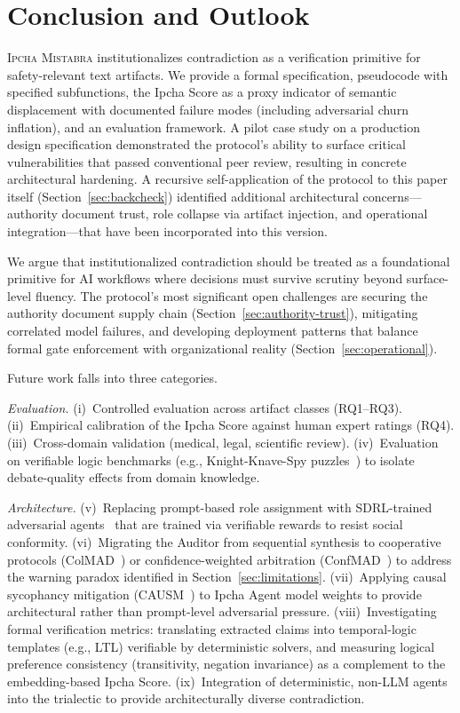 \documentclass[11pt,a4paper]{article}
\newcommand{\methodname}{\textsc{Ipcha Mistabra}}
\begin{document}
\section{Conclusion and Outlook}
\label{sec:outlook}
\methodname{} institutionalizes contradiction as a verification primitive for safety-relevant text artifacts.
We provide a formal specification, pseudocode with specified subfunctions, the Ipcha Score as a proxy indicator of semantic displacement with documented failure modes (including adversarial churn inflation), and an evaluation framework.
A pilot case study on a production design specification demonstrated the protocol's ability to surface critical vulnerabilities that passed conventional peer review, resulting in concrete architectural hardening.
A recursive self-application of the protocol to this paper itself (Section~\ref{sec:backcheck}) identified additional architectural concerns---authority document trust, role collapse via artifact injection, and operational integration---that have been incorporated into this version.

We argue that institutionalized contradiction should be treated as a foundational primitive for AI workflows where decisions must survive scrutiny beyond surface-level fluency.
The protocol's most significant open challenges are securing the authority document supply chain (Section~\ref{sec:authority-trust}), mitigating correlated model failures, and developing deployment patterns that balance formal gate enforcement with organizational reality (Section~\ref{sec:operational}).

Future work falls into three categories.

\emph{Evaluation.}
(i)~Controlled evaluation across artifact classes (RQ1--RQ3).
(ii)~Empirical calibration of the Ipcha Score against human expert ratings (RQ4).
(iii)~Cross-domain validation (medical, legal, scientific review).
(iv)~Evaluation on verifiable logic benchmarks (e.g., Knight-Knave-Spy puzzles~\cite{wu2025_debate}) to isolate debate-quality effects from domain knowledge.

\emph{Architecture.}
(v)~Replacing prompt-based role assignment with SDRL-trained adversarial agents~\cite{sdrl2025} that are trained via verifiable rewards to resist social conformity.
(vi)~Migrating the Auditor from sequential synthesis to cooperative protocols (ColMAD~\cite{colmad2025}) or confidence-weighted arbitration (ConfMAD~\cite{confmad2025}) to address the warning paradox identified in Section~\ref{sec:limitations}.
(vii)~Applying causal sycophancy mitigation (CAUSM~\cite{causm2025}) to Ipcha Agent model weights to provide architectural rather than prompt-level adversarial pressure.
(viii)~Investigating formal verification metrics: translating extracted claims into temporal-logic templates (e.g., LTL) verifiable by deterministic solvers, and measuring logical preference consistency (transitivity, negation invariance) as a complement to the embedding-based Ipcha Score.
(ix)~Integration of deterministic, non-LLM agents into the trialectic to provide architecturally diverse contradiction.
\end{document}
